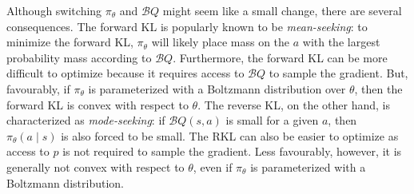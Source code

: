 \documentclass[twoside,11pt]{article}
\newcommand{\statespace}{\mathcal{S}}
\newcommand{\actionspace}{\mathcal{A}}
\newcommand{\Qhat}{{Q}}
\newcommand{\policyparams}{\theta}
\newcommand{\boltzmannQ}{\mathcal{B}Q}
\begin{document}
Although switching $\pi_\policyparams$ and $\boltzmannQ$ might seem like a small change, there are several consequences. The forward KL is popularly known to be \textit{mean-seeking}: to minimize the forward KL, $\pi_\policyparams$ will likely place mass on the $a$ with the largest probability mass according to $\boltzmannQ$. Furthermore, the forward KL can be more difficult to optimize because it requires access to $\boltzmannQ$ to sample the gradient. But, favourably, if $\pi_\theta$ is parameterized with a Boltzmann distribution over $\theta$, then the forward KL is convex with respect to $\theta$. The reverse KL, on the other hand, is characterized as \textit{mode-seeking}: if $\boltzmannQ(s, a)$ is small for a given $a$, then $\pi_\theta(a \mid s)$ is also forced to be small. The RKL can also be easier to optimize as access to $p$ is not required to sample the gradient. Less favourably, however, it is generally not convex with respect to $\theta$, even if $\pi_\theta$ is parameterized with a Boltzmann distribution. 




\end{document}
